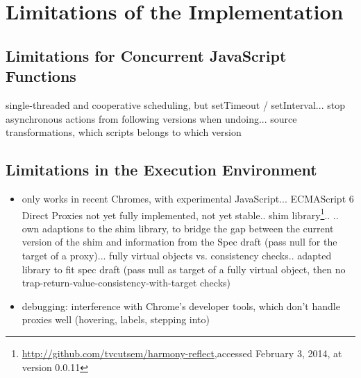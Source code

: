 \section{Limitations of the Implementation}


\subsection{Limitations for Concurrent JavaScript Functions}


single-threaded and cooperative scheduling, but setTimeout / setInterval... stop asynchronous actions from following versions when undoing... source transformations, which scripts belongs to which version


\subsection{Limitations in the Execution Environment}

\begin{itemize}
    \item only works in recent Chromes, with experimental JavaScript... ECMAScript 6 Direct Proxies not yet fully implemented, not yet stable.. shim library\footnote{\url{http://github.com/tvcutsem/harmony-reflect},\goodbreak accessed February 3, 2014, at version 0.0.11}..
.. own adaptions to the shim library, to bridge the gap between the current version of the shim and information from the Spec draft (pass null for the target of a proxy)... fully virtual objects vs. consistency checks.. adapted library to fit spec draft (pass null as target of a fully virtual object, then no trap-return-value-consistency-with-target checks)
\end{itemize}
    


\begin{itemize}
    \item debugging: interference with Chrome's developer tools, which don’t handle proxies well (hovering, labels, stepping into)
\end{itemize}
